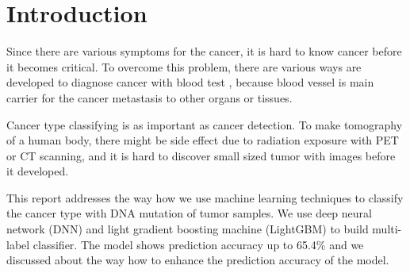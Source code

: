 \section{Introduction}

Since there are various symptoms for the cancer, it is hard to know cancer before it becomes critical. To overcome this problem, there are various ways are developed to diagnose cancer with blood test \cite{cohen2018detection, kalinich2018cancer}, because blood vessel is main carrier for the cancer metastasis to other organs or tissues.

Cancer type classifying is as important as cancer detection. To make tomography of a human body, there might be side effect due to radiation exposure with PET or CT scanning, and it is hard to discover small sized tumor with images before it developed.

This report addresses the way how we use machine learning techniques to classify the cancer type with DNA mutation of tumor samples. We use deep neural network (DNN) and light gradient boosting machine (LightGBM) \cite{ke2017lightgbm} to build multi-label classifier. The model shows prediction accuracy up to 65.4\% and we discussed about the way how to enhance the prediction accuracy of the model.

